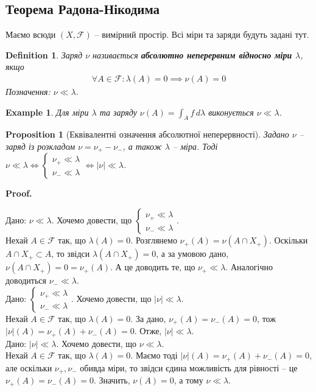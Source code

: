 \documentclass[a4paper, 10pt]{article}
\makeatletter
\theoremstyle{theoremdd}
\newtheorem{definition}[theorem]{Definition}
\newtheorem{example}[theorem]{Example}
\newtheorem{proposition}[theorem]{Proposition}
\renewenvironment{proof}[1][Proof.\\]{\par
\pushQED{\hfill \qed}%
\normalfont \topsep6\p@\@plus6\p@\relax
\trivlist
\item\relax
{\bfseries
#1\@addpunct{.}}\hspace\labelsep\ignorespaces
}{%
\popQED\endtrivlist\@endpefalse
}
\makeatother
\begin{document}
\subsection{Теорема Радона-Нікодима}
Маємо всюди $(X,\mathcal{F})$ -- вимірний простір. Всі міри та заряди будуть задані тут.

\begin{definition}
Заряд $\nu$ називається \textbf{абсолютно неперервним відносно міри $\lambda$}, якщо
\begin{align*}
\forall A \in \mathcal{F}: \lambda(A) = 0 \implies \nu(A) = 0
\end{align*}
Позначення: $\nu \ll \lambda$.
\end{definition}

\begin{example}
Для міри $\lambda$ та заряду $\nu(A) = \displaystyle\int_A f\,d\lambda$ виконується $\nu \ll \lambda$.
\end{example}

\begin{proposition}[Еквівалентні означення абсолютної неперервності]
Задано $\nu$ -- заряд із розкладом $\nu = \nu_+ - \nu_-$, а також $\lambda$ -- міра. Тоді\\
$\nu \ll \lambda \iff \begin{cases} \nu_+ \ll \lambda \\ \nu_- \ll \lambda \end{cases} \iff |\nu| \ll \lambda$.
\end{proposition}

\begin{proof}
Дано: $\nu \ll \lambda$. Хочемо довести, що $\begin{cases} \nu_+ \ll \lambda \\ \nu_- \ll \lambda \end{cases}$.\\
Нехай $A \in \mathcal{F}$ так, що $\lambda(A) = 0$. Розглянемо $\nu_+(A) = \nu(A \cap X_+)$. Оскільки $A \cap X_+ \subset A$, то звідси $\lambda(A \cap X_+) = 0$, а за умовою дано, $\nu(A \cap X_+) = 0 = \nu_+(A)$. А це доводить те, що $\nu_+ \ll \lambda$. Аналогічно доводиться $\nu_- \ll \lambda$.
\bigskip \\
Дано: $\begin{cases} \nu_+ \ll \lambda \\ \nu_- \ll \lambda \end{cases}$. Хочемо довести, що $|\nu| \ll \lambda$.\\
Нехай $A \in \mathcal{F}$ так, що $\lambda(A) = 0$. За дано, $\nu_+(A) = \nu_-(A) = 0$, тож $|\nu|(A) = \nu_+(A) + \nu_-(A) = 0$. Отже, $|\nu| \ll \lambda$.
\bigskip \\
Дано: $|\nu| \ll \lambda$. Хочемо довести, що $\nu \ll \lambda$.\\
Нехай $A \in \mathcal{F}$ так, що $\lambda(A) = 0$. Маємо тоді $|\nu|(A) = \nu_+(A) + \nu_-(A) = 0$, але оскільки $\nu_+,\nu_-$ обивда міри, то звідси єдина можливість для рівності -- це $\nu_+(A) = \nu_-(A) = 0$. Значить, $\nu(A) = 0$, а тому $\nu \ll \lambda$.
\end{proof}
\end{document}
